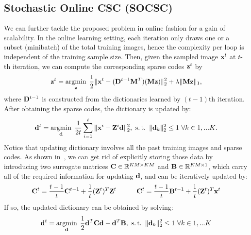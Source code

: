 \subsection{Stochastic Online CSC (SOCSC)}
We can further tackle the proposed problem in online fashion for a gain of scalability. In the online learning setting, each iteration only draws one or a subset (minibatch) of the total training images, hence the complexity per loop is independent of the training sample size. Then, given the sampled image $\signal^t$ at $t$-th iteration, we can compute the corresponding sparse codes $\code^t$ by
\begin{equation} \label{eq:updatingCodeOnline}
    \code^t = \minimize{\code} \frac{1}{2}\|\signal^t - (\Filter^{t-1} \mask^T)(\mask \code) \|_2^2 + \lambda \|\mask \code\|_1,
\end{equation}
where $\Filter^{t-1}$ is constructed from the dictionaries learned by $(t-1)$th iteration. After obtaining the sparse codes, the dictionary is updated by:
\begin{equation}
    \filter^t = \minimize{\filter} \frac{1}{2t}\sum_{i=1}^{t} \|\signal^i - \Code^i \filter \|_2^2, ~\subjectto ~ \|\filter_k\|^2_2 \leq 1 ~ \forall k \in {1,...K}.
\end{equation}
Notice that updating dictionary involves all the past training images and sparse codes. As shown in~\cite{mairal2009online,mairal2010online}, we can get rid of explicitly storing those data by introducing two surrogate matrices $\surC \in \mathbb{R}^{KM \times KM}$ and $\surB \in \mathbb{R}^{KM \times 1}$, which carry all of the required information for updating $\filter$, and can be iteratively updated by:
\begin{equation} \label{eq:updateSur}
    \surC^t  = \frac{t-1}{t} \surC^{t-1} + \frac{1}{t}(\Code^t)^T\Code^t ~~~~~~~~~ \surC^t  = \frac{t-1}{t} \surB^{t-1} + \frac{1}{t}(\Code^t)^T\signal^t
\end{equation}
If so, the updated dictionary can be obtained by solving:
\begin{equation} \label{eq:updatingFilterOnline}
    \filter^t = \minimize{\filter} \frac{1}{2} \filter^T\surC\filter - \filter^T\surB, ~ \subjectto ~ \|\filter_k\|_2^2 \leq 1 ~ \forall k \in {1,...K}
\end{equation}

